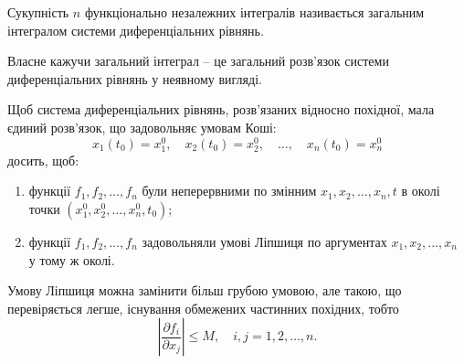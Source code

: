 \begin{definition}
	Сукупність $n$ функціонально незалежних інтегралів називається загальним інтегралом системи диференціальних рівнянь.
\end{definition}

Власне кажучи загальний інтеграл -- це загальний роз\-в'яз\-ок системи диференціальних рівнянь у неявному вигляді.

\begin{theorem}
	Щоб система диференціальних рівнянь, розв'язаних відносно похідної, мала єдиний роз\-в'яз\-ок, що задовольняє умовам Коші: 
	\begin{equation*}
		x_1(t_0) = x_1^0, \quad x_2(t_0) = x_2^0, \quad \ldots, \quad x_n(t_0) = x_n^0
	\end{equation*}
	досить, щоб:
	\begin{enumerate}
		\item функції $f_1, f_2, \ldots, f_n$ були неперервними по змінним $x_1, x_2, \ldots, x_n, t$ в околі точки $\left(x_1^0, x_2^0, \ldots, x_n^0, t_0\right)$;
		\item функції $f_1, f_2, \ldots, f_n$ задовольняли умові Ліпшиця по аргументах $x_1, x_2, \ldots, x_n$ у тому ж околі.
	\end{enumerate}
\end{theorem}

\begin{remark}
	Умову Ліпшиця можна замінити більш грубою умовою, але такою, що перевіряється легше, існування обмежених частинних похідних, тобто 
	\begin{equation*}
		\left| \frac{\partial f_i}{\partial x_j} \right| \le M, \quad i,j = 1, 2, \ldots, n.
	\end{equation*}
\end{remark}